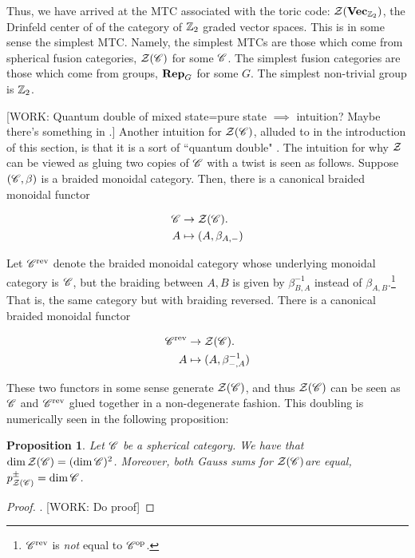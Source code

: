 \documentclass{article}
\newtheorem{proposition}{Proposition}[section]
\theoremstyle{definition}
\numberwithin{figure}{section}
\begin{document}
Thus, we have arrived at the MTC associated with the toric code: $\mathcal{Z}(\bold{Vec}_{\mathbb{Z}_2})$, the Drinfeld center of of the category of $\mathbb{Z}_2$ graded vector spaces. This is in some sense the simplest MTC. Namely, the simplest MTCs are those which come from spherical fusion categories, $\mathcal{Z}(\mathscr{C})$ for some $\mathscr{C}$. The simplest fusion categories are those which come from groups, $\bold{Rep}_G$ for some $G$. The simplest non-trivial group is $\mathbb{Z}_2$.

[WORK: Quantum double of mixed state=pure state $\implies$ intuition? Maybe there's something in \cite{cowtan2022quantum}.] Another intuition for $\mathcal{Z}(\mathscr{C})$, alluded to in the introduction of this section, is that it is a sort of ``quantum double" \cite{felice2017hopf}. The intuition for why $\mathcal{Z}$ can be viewed as gluing two copies of $\mathscr{C}$ with a twist is seen as follows. Suppose $(\mathscr{C},\beta)$ is a braided monoidal category. Then, there is a canonical braided monoidal functor

\begin{align*}
\mathscr{C} &\to \mathcal{Z}(\mathscr{C}).\\
A &\mapsto (A,\beta_{A,\--})
\end{align*}

Let $\mathscr{C}^{\text{rev}}$ denote the braided monoidal category whose underlying monoidal category is $\mathscr{C}$, but the braiding between $A,B$ is given by $\beta_{B,A}^{-1}$ instead of $\beta_{A,B}$.\footnote{$\mathscr{C}^{\text{rev}}$ is \textit{not} equal to $\mathscr{C}^{\mathrm{op}}$.} That is, the same category but with braiding reversed. There is a canonical braided monoidal functor

\begin{align*}
\mathscr{C}^{\text{rev}} &\to \mathcal{Z}(\mathscr{C}).\\
A &\mapsto (A,\beta^{-1}_{\--,A})
\end{align*}

These two functors in some sense generate $\mathcal{Z}(\mathscr{C})$, and thus $\mathcal{Z}(\mathscr{C})$ can be seen as $\mathscr{C}$ and $\mathscr{C}^{\text{rev}}$ glued together in a non-degenerate fashion. This doubling is numerically seen in the following proposition:

\begin{proposition} Let $\mathscr{C}$ be a spherical category. We have that $\dim \mathcal{Z}(\mathscr{C}) = (\dim \mathscr{C})^2$. Moreover, both Gauss sums for $\mathcal{Z}(\mathscr{C})$are equal, $p_{\mathcal{Z}(\mathscr{C})}^{\pm}=\dim \mathscr{C}$.
\end{proposition}
\begin{proof}. [WORK: Do proof]
\end{proof}
\end{document}
